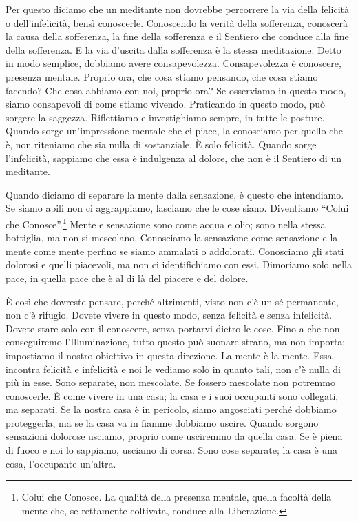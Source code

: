 Per questo diciamo che un meditante non dovrebbe percorrere la via della
felicità o dell'infelicità, bensì conoscerle. Conoscendo la verità della
sofferenza, conoscerà la causa della sofferenza, la fine della
sofferenza e il Sentiero che conduce alla fine della sofferenza. E la
via d'uscita dalla sofferenza è la stessa meditazione. Detto in modo
semplice, dobbiamo avere consapevolezza. Consapevolezza è conoscere,
presenza mentale. Proprio ora, che cosa stiamo pensando, che cosa stiamo
facendo? Che cosa abbiamo con noi, proprio ora? Se osserviamo in questo
modo, siamo consapevoli di come stiamo vivendo. Praticando in questo
modo, può sorgere la saggezza. Riflettiamo e investighiamo sempre, in
tutte le posture. Quando sorge un'impressione mentale che ci piace, la
conosciamo per quello che è, non riteniamo che sia nulla di sostanziale.
È solo felicità. Quando sorge l'infelicità, sappiamo che essa è
indulgenza al dolore, che non è il Sentiero di un meditante.

Quando diciamo di separare la mente dalla sensazione, è questo che
intendiamo. Se siamo abili non ci aggrappiamo, lasciamo che le cose
siano. Diventiamo ``Colui che Conosce''.\footnote{Colui che Conosce. La
  qualità della presenza mentale, quella facoltà della mente che, se
  rettamente coltivata, conduce alla Liberazione.} Mente e sensazione
sono come acqua e olio; sono nella stessa bottiglia, ma non si
mescolano. Conosciamo la sensazione come sensazione e la mente come
mente perfino se siamo ammalati o addolorati. Conosciamo gli stati
dolorosi e quelli piacevoli, ma non ci identifichiamo con essi.
Dimoriamo solo nella pace, in quella pace che è al di là del piacere e
del dolore.

È così che dovreste pensare, perché altrimenti, visto non c'è un sé
permanente, non c'è rifugio. Dovete vivere in questo modo, senza
felicità e senza infelicità. Dovete stare solo con il conoscere, senza
portarvi dietro le cose. Fino a che non conseguiremo l'Illuminazione,
tutto questo può suonare strano, ma non importa: impostiamo il nostro
obiettivo in questa direzione. La mente è la mente. Essa incontra
felicità e infelicità e noi le vediamo solo in quanto tali, non c'è
nulla di più in esse. Sono separate, non mescolate. Se fossero mescolate
non potremmo conoscerle. È come vivere in una casa; la casa e i suoi
occupanti sono collegati, ma separati. Se la nostra casa è in pericolo,
siamo angosciati perché dobbiamo proteggerla, ma se la casa va in fiamme
dobbiamo uscire. Quando sorgono sensazioni dolorose usciamo, proprio
come usciremmo da quella casa. Se è piena di fuoco e noi lo sappiamo,
usciamo di corsa. Sono cose separate; la casa è una cosa, l'occupante
un'altra.

